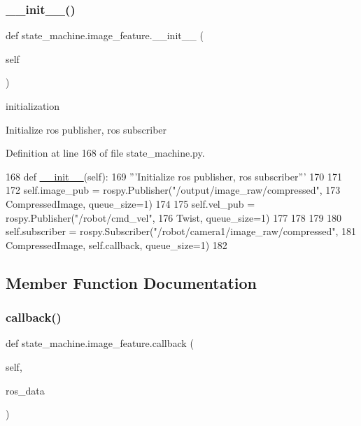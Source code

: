 \subsubsection{\texorpdfstring{\+\_\+\+\_\+init\+\_\+\+\_\+()}{\_\_init\_\_()}}
{\footnotesize\ttfamily def state\+\_\+machine.\+image\+\_\+feature.\+\_\+\+\_\+init\+\_\+\+\_\+ (\begin{DoxyParamCaption}\item[{}]{self }\end{DoxyParamCaption})}



initialization 

\begin{DoxyVerb}Initialize ros publisher, ros subscriber\end{DoxyVerb}
 

Definition at line 168 of file state\+\_\+machine.\+py.


\begin{DoxyCode}
168     \textcolor{keyword}{def }\hyperlink{classstate__machine_1_1Play_a5993a23d8be7f7b2647f71ede0334957}{\_\_init\_\_}(self):
169         \textcolor{stringliteral}{'''Initialize ros publisher, ros subscriber'''}
170 
171         
172         self.image\_pub = rospy.Publisher(\textcolor{stringliteral}{"/output/image\_raw/compressed"},
173                                          CompressedImage, queue\_size=1)
174 
175         self.vel\_pub = rospy.Publisher(\textcolor{stringliteral}{"/robot/cmd\_vel"},
176                                        Twist, queue\_size=1)
177  
178 
179         
180         self.subscriber = rospy.Subscriber(\textcolor{stringliteral}{"/robot/camera1/image\_raw/compressed"},
181                                            CompressedImage, self.callback,  queue\_size=1)
182 
\end{DoxyCode}


\subsection{Member Function Documentation}
\mbox{\label{classstate__machine_1_1image__feature_a18e75f60a2a7f566add766b5f892c6f5}} 
\subsubsection{\texorpdfstring{callback()}{callback()}}
{\footnotesize\ttfamily def state\+\_\+machine.\+image\+\_\+feature.\+callback (\begin{DoxyParamCaption}\item[{}]{self,  }\item[{}]{ros\+\_\+data }\end{DoxyParamCaption})}



